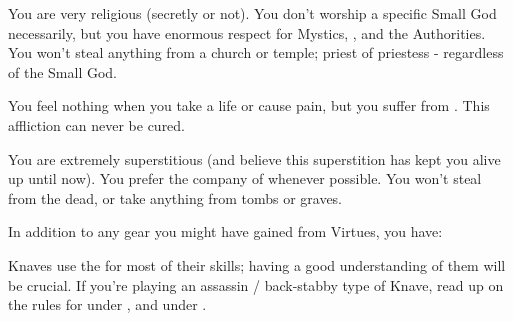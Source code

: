 \begin{multicols*}{2}

    You are very religious (secretly or not). You don't worship a specific Small God necessarily, but you have enormous respect for Mystics, \TheAuthority, and the Authorities. You won't steal anything from a church or temple; priest of priestess - regardless of the Small God.



    You feel nothing when you take a life or cause pain, but you suffer from . This affliction can never be cured.



    You are extremely superstitious (and believe this superstition has kept you alive up until now). You prefer the company of  whenever possible. You won't steal from the dead, or take anything from tombs or graves.

\cbreak


    In addition to any gear you might have gained from Virtues, you have:


  

    Knaves use the  for most of their skills; having a good understanding of them will be crucial. If you're playing an assassin / back-stabby type of Knave, read up on the rules for  under , and  under .

\end{multicols*}

